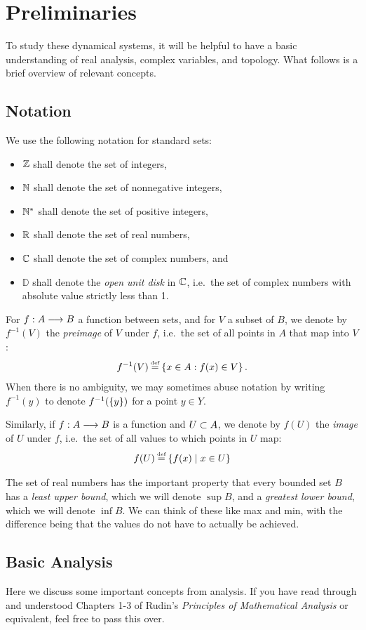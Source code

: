 \documentclass[twoside]{article}
\newcommand*{\D}{\mathbb{D}}
\newcommand*{\1}{\mathbbm{1}}
\begin{document}
\section{Preliminaries}
To study these dynamical systems, it will be helpful to have a basic understanding of real analysis, complex variables, and topology. What follows is a brief overview of relevant concepts.

\subsection{Notation}
We use the following notation for standard sets:
\begin{itemize}
  \item \(\Z\) shall denote the set of integers,
  \item \(\N\) shall denote the set of nonnegative integers,
  \item \(\N^*\) shall denote the set of positive integers,
  \item \(\R\) shall denote the set of real numbers,
  \item \(\C\) shall denote the set of complex numbers, and
  \item \(\D\) shall denote the \emph{open unit disk} in \(\C\), i.e.\ the set of complex numbers with absolute value strictly less than 1.
\end{itemize}
For \(f:A\lra B\) a function between sets, and for \(V\) a subset of \(B\), we denote by \(f^{-1}(V)\) the \emph{preimage} of \(V\) under \(f\), i.e.\ the set of all points in \(A\) that map into \(V\):
\[
  f^{-1}(V) \defeq \set{x\in A : f(x) \in V}.
\]
When there is no ambiguity, we may sometimes abuse notation by writing \(f^{-1}(y)\) to denote \(f^{-1}(\set{y})\) for a point \(y\in Y\).

Similarly, if \(f:A\lra B\) is a function and \(U\ss A\), we denote by \(f(U)\) the \emph{image} of \(U\) under \(f\), i.e.\ the set of all values to which points in \(U\) map:
\[
  f(U) \defeq \set{f(x) \mid x\in U}
\]

The set of real numbers has the important property that every bounded set \(B\) has a \emph{least upper bound}, which we will denote \(\sup B\), and a \emph{greatest lower bound}, which we will denote \(\inf B\). We can think of these like max and min, with the difference being that the values do not have to actually be achieved.

\subsection{Basic Analysis}
Here we discuss some important concepts from analysis. If you have read through and understood Chapters 1-3 of Rudin's \emph{Principles of Mathematical Analysis} or equivalent, feel free to pass this over.
\end{document}
